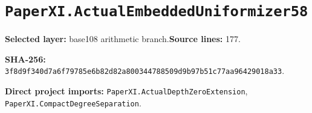 \documentclass[10pt,oneside]{book}
\begin{document}
\section{\texorpdfstring{\nolinkurl{PaperXI.ActualEmbeddedUniformizer58}}{PaperXI.ActualEmbeddedUniformizer58}}\label{module:PaperXI.ActualEmbeddedUniformizer58}

\textbf{Selected layer:} base108 arithmetic branch.\quad\textbf{Source lines:} 177.\par\textbf{SHA-256:} {\scriptsize\nolinkurl{3f8d9f340d7a6f79785e6b82d82a800344788509d9b97b51c77aa96429018a33}}.


\textbf{Direct project imports:} \nolinkurl{PaperXI.ActualDepthZeroExtension}, \nolinkurl{PaperXI.CompactDegreeSeparation}.
\end{document}
